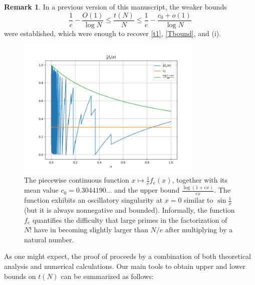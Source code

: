 \documentclass[12pt,a4paper,reqno]{amsart}
\numberwithin{equation}{section}
\theoremstyle{plain}
\theoremstyle{definition}
\newtheorem{remark}[theorem]{Remark}
\begin{document}
\begin{remark}\label{old} In a previous version \cite{tao} of this manuscript, the weaker bounds
  $$ \frac{1}{e} - \frac{O(1)}{\log N} \leq \frac{t(N)}{N} \leq \frac{1}{e} - \frac{c_0+o(1)}{\log N}$$
were established, which were enough to recover \eqref{t1}, \eqref{Tbound}, and (i). 
\end{remark}  

\begin{figure}
  \centering
  \includegraphics[width=0.8\textwidth]{integ.png}
  \caption{The piecewise continuous function $x\mapsto \frac{1}{e} f_e(x)$, together with its mean value $c_0 = 0.3044190\dots$ and the upper bound $\frac{\log(1+ex)}{ex}$.  The function exhibits an oscillatory singularity at $x=0$ similar to $\sin \frac{1}{x}$ (but it is always nonnegative and bounded). Informally, the function $f_e$ quantifies the difficulty that large primes in the factorization of $N!$ have in becoming slightly larger than $N/e$ after multiplying by a natural number.}\label{fig-mean}
\end{figure}

As one might expect, the proof of  proceeds by a combination of both theoretical analysis and numerical calculations.  Our main tools to obtain upper and lower bounds on $t(N)$ can be summarized as follows:
\end{document}
